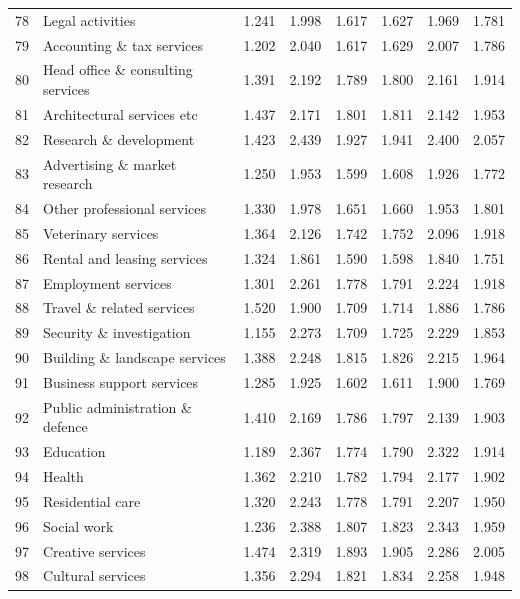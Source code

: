 \begin{longtable}{@{\extracolsep{\fill}}rlrrrrrr@{}}
    78    & Legal activities & 1.241 & 1.998 & 1.617 & 1.627 & 1.969 & 1.781 \\
    79    & Accounting \& tax services & 1.202 & 2.040 & 1.617 & 1.629 & 2.007 & 1.786 \\
    80    & Head office \& consulting services & 1.391 & 2.192 & 1.789 & 1.800 & 2.161 & 1.914 \\
    81    & Architectural services etc & 1.437 & 2.171 & 1.801 & 1.811 & 2.142 & 1.953 \\
    82    & Research \& development & 1.423 & 2.439 & 1.927 & 1.941 & 2.400 & 2.057 \\
    83    & Advertising \& market research & 1.250 & 1.953 & 1.599 & 1.608 & 1.926 & 1.772 \\
    84    & Other professional services & 1.330 & 1.978 & 1.651 & 1.660 & 1.953 & 1.801 \\
    85    & Veterinary services & 1.364 & 2.126 & 1.742 & 1.752 & 2.096 & 1.918 \\
    86    & Rental and leasing services & 1.324 & 1.861 & 1.590 & 1.598 & 1.840 & 1.751 \\
    87    & Employment services & 1.301 & 2.261 & 1.778 & 1.791 & 2.224 & 1.918 \\
    88    & Travel \& related services & 1.520 & 1.900 & 1.709 & 1.714 & 1.886 & 1.786 \\
    89    & Security \& investigation & 1.155 & 2.273 & 1.709 & 1.725 & 2.229 & 1.853 \\
    90    & Building \& landscape services & 1.388 & 2.248 & 1.815 & 1.826 & 2.215 & 1.964 \\
    91    & Business support services & 1.285 & 1.925 & 1.602 & 1.611 & 1.900 & 1.769 \\
    92    & Public administration \& defence & 1.410 & 2.169 & 1.786 & 1.797 & 2.139 & 1.903 \\
    93    & Education & 1.189 & 2.367 & 1.774 & 1.790 & 2.322 & 1.914 \\
    94    & Health & 1.362 & 2.210 & 1.782 & 1.794 & 2.177 & 1.902 \\
    95    & Residential care & 1.320 & 2.243 & 1.778 & 1.791 & 2.207 & 1.950 \\
    96    & Social work & 1.236 & 2.388 & 1.807 & 1.823 & 2.343 & 1.959 \\
    97    & Creative services & 1.474 & 2.319 & 1.893 & 1.905 & 2.286 & 2.005 \\
    98    & Cultural services & 1.356 & 2.294 & 1.821 & 1.834 & 2.258 & 1.948 \\

\end{longtable}
